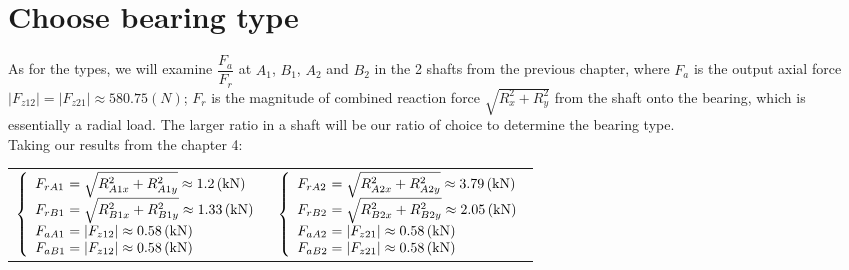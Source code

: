 \section{Choose bearing type}
As for the types, we will examine $  \dfrac{F_a}{F_r}  $ at $ A_1 $, $ B_1 $, $ A_2 $ and $ B_2 $ in the 2 shafts from the previous chapter, where $ F_a $ is the output axial force $ |F_{z12}| = |F_{z21}| \approx 580.75 \unit{(N)} $; $ F_r $ is the magnitude of combined reaction force $ \sqrt{R_x^2+R_y^2} $ from the shaft onto the bearing, which is essentially a radial load. The larger ratio in a shaft will be our ratio of choice to determine the bearing type.\\
Taking our results from the chapter 4: \vskip2mm
{\centering
	\begin{tabular}[ht]{p{7cm}p{7cm}}
		$
		\left\{ 
		\begin{array}{l@{{} = {}}l}
		F_{rA1} & \sqrt{R_{A1x}^2+R_{A1y}^2}  \approx  1.2\unit{(kN)}\\
		F_{rB1} & \sqrt{R_{B1x}^2+R_{B1y}^2}  \approx  1.33\unit{(kN)}\\
		F_{aA1} & |F_{z12}|  \approx  0.58 \unit{(kN)}\\
		F_{aB1} & |F_{z12}|  \approx  0.58 \unit{(kN)}\\
		\end{array}
		\right.
		$ & $
		\left\{ 
		\begin{array}{l@{{} = {}}l}
		F_{rA2} & \sqrt{R_{A2x}^2+R_{A2y}^2}  \approx  3.79\unit{(kN)}\\
		F_{rB2} & \sqrt{R_{B2x}^2+R_{B2y}^2}  \approx  2.05\unit{(kN)}\\
		F_{aA2} & |F_{z21}|  \approx  0.58 \unit{(kN)}\\
		F_{aB2} & |F_{z21}|  \approx  0.58 \unit{(kN)}\\
		\end{array}
		\right.
		$
\end{tabular}}\vskip2mm


